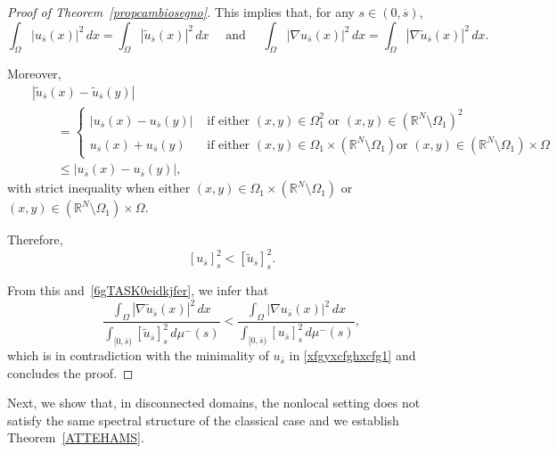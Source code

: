 \documentclass[12pt,a4paper,intlimits,sumlimits]{amsart}
\def \R {\mathbb{R}}
\theoremstyle{definition}
\theoremstyle{plain}
\numberwithin{equation}{section}
\renewcommand{\le}{\leqslant}
\begin{document}
\begin{proof}[Proof of Theorem~\ref{propcambiosegno}]
This implies that, for any $s\in (0,\overline{s})$,
\begin{equation}\label{6gTASK0eidkjfer} \int_{\Omega}|u_{\overline s}(x)|^2\,dx=
\int_{\Omega}|\widetilde u_{\overline s}(x)|^2\,dx\quad \mbox{ and } \quad 
\int_{\Omega}|\nabla u_{\overline s}(x)|^2\,dx=\int_{\Omega}|\nabla \widetilde u_{\overline s}(x)|^2\,dx .\end{equation}

Moreover,
\begin{eqnarray*}&&
|\widetilde u_{\overline s}(x)-\widetilde u_{\overline s}(y)|\\&&\qquad=\begin{cases}
| u_{\overline s}(x)- u_{\overline s}(y)|
&{\mbox{ if either $(x,y)\in\Omega_1^2$ or $(x,y)\in(\R^N\setminus\Omega_1)^2$}}\\
u_{\overline s}(x)+ u_{\overline s}(y)
&{\mbox{ if either $(x,y)\in\Omega_1\times(\R^N\setminus\Omega_1)$
or $(x,y)\in(\R^N\setminus\Omega_1)\times\Omega$}}
\end{cases}\\&&\qquad\le
| u_{\overline s}(x)- u_{\overline s}(y)|,
\end{eqnarray*}
with strict inequality when
either $(x,y)\in\Omega_1\times(\R^N\setminus\Omega_1)$
or $(x,y)\in(\R^N\setminus\Omega_1)\times\Omega$.

Therefore,
\[
[u_{\overline s}]_s^2<[\widetilde u_{\overline s}]_s^2 .
\] 

From this and~\eqref{6gTASK0eidkjfer}, we infer that
\[
\dfrac{\displaystyle\int_{\Omega}|\nabla \widetilde u_{\overline s}(x)|^2\,dx}{\displaystyle \int_{[0,\overline s)}[\widetilde u_{\overline s}]_s^2\,d\mu^-(s)}<
\dfrac{\displaystyle\int_{\Omega}|\nabla u_{\overline s}(x)|^2\,dx}{\displaystyle \int_{[0,\overline s)}[u_{\overline s}]_s^2\,d\mu^-(s)},
\]
which is in contradiction with the minimality of $u_{\overline s}$
in \eqref{xfgyxcfghxcfg1} and concludes the proof.
\end{proof}

Next, we show that, in disconnected domains, the nonlocal setting does not satisfy the same
spectral structure of the classical case and we establish Theorem~\ref{ATTEHAMS}.
\end{document}
